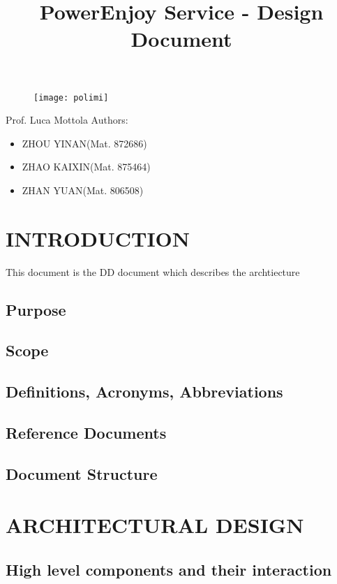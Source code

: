 \documentclass{article}
\title{PowerEnjoy Service - Design Document}
\begin{document}
\begin{titlepage}
\begin{figure}
	\centering
	\texttt{[image: polimi]}
\end{figure}
\maketitle
\centering
Prof. Luca Mottola
\newline
\raggedleft
Authors:
\begin{itemize}
	\raggedleft
	\item ZHOU YINAN(Mat. 872686)
	\item ZHAO KAIXIN(Mat. 875464)
	\item ZHAN YUAN(Mat. 806508)	
\end{itemize}
\end{titlepage}

\tableofcontents
\newpage

	
	\section{INTRODUCTION}
		This document is the DD document which describes the archtiecture
	\subsection{Purpose}
	\subsection{Scope}
	\subsection{Definitions, Acronyms, Abbreviations}
	\subsection{Reference Documents}
	\subsection{Document Structure}
	\newpage
	\section{ARCHITECTURAL DESIGN}
	\subsection{High level components and their interaction}
\end{document}

